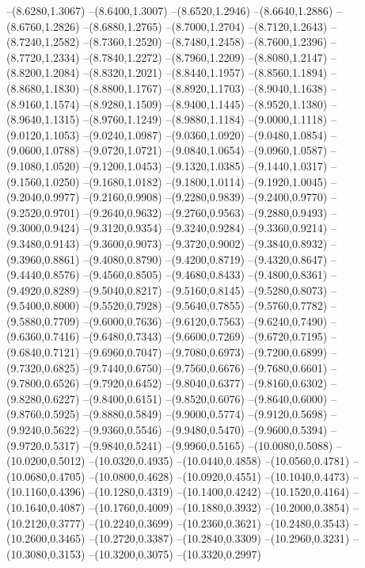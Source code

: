 {\begin{scope}
--(8.6280,1.3067)
--(8.6400,1.3007)
--(8.6520,1.2946)
--(8.6640,1.2886)
--(8.6760,1.2826)
--(8.6880,1.2765)
--(8.7000,1.2704)
--(8.7120,1.2643)
--(8.7240,1.2582)
--(8.7360,1.2520)
--(8.7480,1.2458)
--(8.7600,1.2396)
--(8.7720,1.2334)
--(8.7840,1.2272)
--(8.7960,1.2209)
--(8.8080,1.2147)
--(8.8200,1.2084)
--(8.8320,1.2021)
--(8.8440,1.1957)
--(8.8560,1.1894)
--(8.8680,1.1830)
--(8.8800,1.1767)
--(8.8920,1.1703)
--(8.9040,1.1638)
--(8.9160,1.1574)
--(8.9280,1.1509)
--(8.9400,1.1445)
--(8.9520,1.1380)
--(8.9640,1.1315)
--(8.9760,1.1249)
--(8.9880,1.1184)
--(9.0000,1.1118)
--(9.0120,1.1053)
--(9.0240,1.0987)
--(9.0360,1.0920)
--(9.0480,1.0854)
--(9.0600,1.0788)
--(9.0720,1.0721)
--(9.0840,1.0654)
--(9.0960,1.0587)
--(9.1080,1.0520)
--(9.1200,1.0453)
--(9.1320,1.0385)
--(9.1440,1.0317)
--(9.1560,1.0250)
--(9.1680,1.0182)
--(9.1800,1.0114)
--(9.1920,1.0045)
--(9.2040,0.9977)
--(9.2160,0.9908)
--(9.2280,0.9839)
--(9.2400,0.9770)
--(9.2520,0.9701)
--(9.2640,0.9632)
--(9.2760,0.9563)
--(9.2880,0.9493)
--(9.3000,0.9424)
--(9.3120,0.9354)
--(9.3240,0.9284)
--(9.3360,0.9214)
--(9.3480,0.9143)
--(9.3600,0.9073)
--(9.3720,0.9002)
--(9.3840,0.8932)
--(9.3960,0.8861)
--(9.4080,0.8790)
--(9.4200,0.8719)
--(9.4320,0.8647)
--(9.4440,0.8576)
--(9.4560,0.8505)
--(9.4680,0.8433)
--(9.4800,0.8361)
--(9.4920,0.8289)
--(9.5040,0.8217)
--(9.5160,0.8145)
--(9.5280,0.8073)
--(9.5400,0.8000)
--(9.5520,0.7928)
--(9.5640,0.7855)
--(9.5760,0.7782)
--(9.5880,0.7709)
--(9.6000,0.7636)
--(9.6120,0.7563)
--(9.6240,0.7490)
--(9.6360,0.7416)
--(9.6480,0.7343)
--(9.6600,0.7269)
--(9.6720,0.7195)
--(9.6840,0.7121)
--(9.6960,0.7047)
--(9.7080,0.6973)
--(9.7200,0.6899)
--(9.7320,0.6825)
--(9.7440,0.6750)
--(9.7560,0.6676)
--(9.7680,0.6601)
--(9.7800,0.6526)
--(9.7920,0.6452)
--(9.8040,0.6377)
--(9.8160,0.6302)
--(9.8280,0.6227)
--(9.8400,0.6151)
--(9.8520,0.6076)
--(9.8640,0.6000)
--(9.8760,0.5925)
--(9.8880,0.5849)
--(9.9000,0.5774)
--(9.9120,0.5698)
--(9.9240,0.5622)
--(9.9360,0.5546)
--(9.9480,0.5470)
--(9.9600,0.5394)
--(9.9720,0.5317)
--(9.9840,0.5241)
--(9.9960,0.5165)
--(10.0080,0.5088)
--(10.0200,0.5012)
--(10.0320,0.4935)
--(10.0440,0.4858)
--(10.0560,0.4781)
--(10.0680,0.4705)
--(10.0800,0.4628)
--(10.0920,0.4551)
--(10.1040,0.4473)
--(10.1160,0.4396)
--(10.1280,0.4319)
--(10.1400,0.4242)
--(10.1520,0.4164)
--(10.1640,0.4087)
--(10.1760,0.4009)
--(10.1880,0.3932)
--(10.2000,0.3854)
--(10.2120,0.3777)
--(10.2240,0.3699)
--(10.2360,0.3621)
--(10.2480,0.3543)
--(10.2600,0.3465)
--(10.2720,0.3387)
--(10.2840,0.3309)
--(10.2960,0.3231)
--(10.3080,0.3153)
--(10.3200,0.3075)
--(10.3320,0.2997)

\end{scope}}

